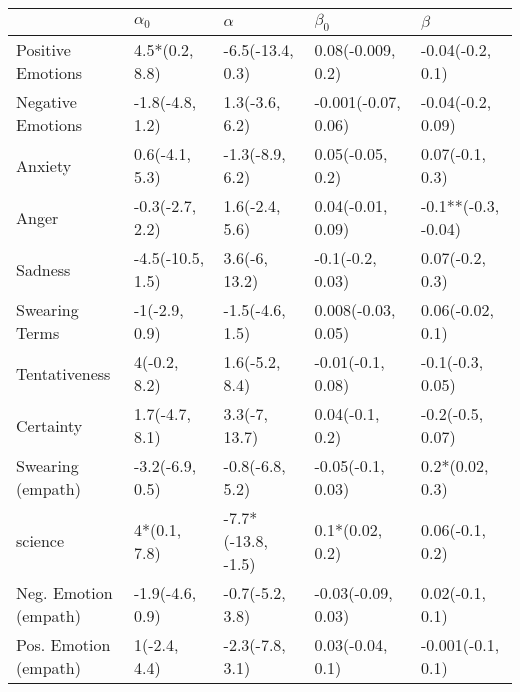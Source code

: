 \begin{tabular}{lllll}
\toprule
{} &        $\alpha_0$ &            $\alpha$ &            $\beta_0$ &              $\beta$ \\
\midrule
Positive Emotions     &    4.5*(0.2, 8.8) &    -6.5(-13.4, 0.3) &    0.08(-0.009, 0.2) &     -0.04(-0.2, 0.1) \\
Negative Emotions     &   -1.8(-4.8, 1.2) &      1.3(-3.6, 6.2) &  -0.001(-0.07, 0.06) &    -0.04(-0.2, 0.09) \\
Anxiety               &    0.6(-4.1, 5.3) &     -1.3(-8.9, 6.2) &     0.05(-0.05, 0.2) &      0.07(-0.1, 0.3) \\
Anger                 &   -0.3(-2.7, 2.2) &      1.6(-2.4, 5.6) &    0.04(-0.01, 0.09) &  -0.1**(-0.3, -0.04) \\
Sadness               &  -4.5(-10.5, 1.5) &       3.6(-6, 13.2) &     -0.1(-0.2, 0.03) &      0.07(-0.2, 0.3) \\
Swearing Terms        &     -1(-2.9, 0.9) &     -1.5(-4.6, 1.5) &   0.008(-0.03, 0.05) &     0.06(-0.02, 0.1) \\
Tentativeness         &      4(-0.2, 8.2) &      1.6(-5.2, 8.4) &    -0.01(-0.1, 0.08) &     -0.1(-0.3, 0.05) \\
Certainty             &    1.7(-4.7, 8.1) &       3.3(-7, 13.7) &      0.04(-0.1, 0.2) &     -0.2(-0.5, 0.07) \\
Swearing (empath)     &   -3.2(-6.9, 0.5) &     -0.8(-6.8, 5.2) &    -0.05(-0.1, 0.03) &      0.2*(0.02, 0.3) \\
science               &      4*(0.1, 7.8) &  -7.7*(-13.8, -1.5) &      0.1*(0.02, 0.2) &      0.06(-0.1, 0.2) \\
Neg. Emotion (empath) &   -1.9(-4.6, 0.9) &     -0.7(-5.2, 3.8) &   -0.03(-0.09, 0.03) &      0.02(-0.1, 0.1) \\
Pos. Emotion (empath) &      1(-2.4, 4.4) &     -2.3(-7.8, 3.1) &     0.03(-0.04, 0.1) &    -0.001(-0.1, 0.1) \\
\bottomrule
\end{tabular}
